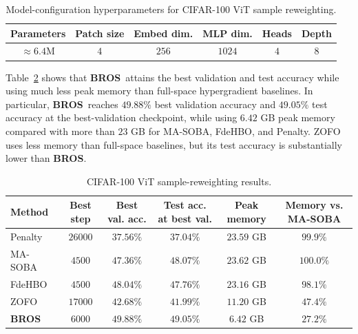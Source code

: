 \documentclass{pkumelon}
\theoremstyle{plain}
\newcommand{\oursname}{\textnormal{\textbf{BROS}}}
\newcommand{\ours}{\oursname\ }
\newcommand{\ourslast}{\oursname}
\begin{document}
\begin{table}[t!]
\centering
\caption{Model-configuration hyperparameters for CIFAR-100 ViT sample reweighting.}
\label{tab:vit_hyperparams}
\small
\setlength{\tabcolsep}{4pt}
\renewcommand{\arraystretch}{1.12}
\begin{threeparttable}
\begin{tabular}{cccccc}
\toprule
Parameters & Patch size & Embed dim. & MLP dim. & Heads & Depth \\
\midrule
$\approx 6.4$M & $4$ & $256$ & $1024$ & $4$ & $8$ \\
\bottomrule
\end{tabular}
\end{threeparttable}
\end{table}

Table~\ref{tab:vit_appendix} shows that \ours attains the best validation and test accuracy while using much less peak memory than full-space hypergradient baselines. In particular, \ours reaches $49.88\%$ best validation accuracy and $49.05\%$ test accuracy at the best-validation checkpoint, while using $6.42$ GB peak memory compared with more than $23$ GB for MA-SOBA, FdeHBO, and Penalty. ZOFO uses less memory than full-space baselines, but its test accuracy is substantially lower than \ourslast.

\begin{table}[t!]
\centering
\caption{CIFAR-100 ViT sample-reweighting results.}
\label{tab:vit_appendix}
\small
\setlength{\tabcolsep}{4pt}
\renewcommand{\arraystretch}{1.12}
\begin{tabular}{lccccc}
\toprule
Method & Best step & Best val. acc. & Test acc. at best val. & Peak memory & Memory vs. MA-SOBA \\
\midrule
Penalty~\citep{mehra2021penalty} & $26000$ & $37.56\%$ & $37.04\%$ & $23.59$ GB & $99.9\%$ \\
MA-SOBA~\citep{chen2024optimal} & $4500$ & $47.36\%$ & $48.07\%$ & $23.62$ GB & $100.0\%$ \\
FdeHBO~\citep{yang2023achieving} & $4500$ & $48.04\%$ & $47.76\%$ & $23.16$ GB & $98.1\%$ \\
ZOFO~\citep{shirkavand2025bilevel} & $17000$ & $42.68\%$ & $41.99\%$ & $11.20$ GB & $47.4\%$ \\
\rowcolor{boxbg}
\ourslast & $6000$ & $49.88\%$ & $49.05\%$ & $6.42$ GB & $27.2\%$ \\
\bottomrule
\end{tabular}
\end{table}
\end{document}
